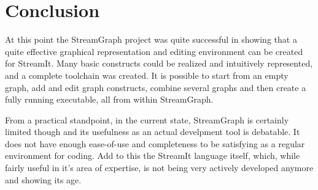 \documentclass[journal]{IEEEtran}
\begin{document}



\section{Conclusion}

At this point the StreamGraph project was quite successful in showing that a
quite effective graphical representation and editing environment can be
created for StreamIt. Many basic constructs could be realized and intuitively
represented, and a complete toolchain was created. It is possible to start
from an empty graph, add and edit graph constructs, combine several graphs and
then create a fully running executable, all from within StreamGraph.

From a practical standpoint, in the current state, StreamGraph is certainly
limited though and its usefulness as an actual develpment tool is debatable.
It does not have enough ease-of-use and completeness to be satisfying as a
regular environment for coding. Add to this the StreamIt language itself,
which, while fairly useful in it's area of expertise, is not being very
actively developed anymore and showing its age.
\end{document}
